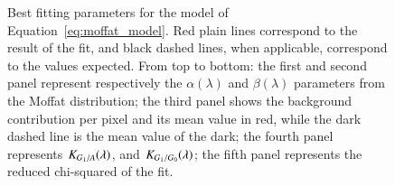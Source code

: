\begin{figure}[h]
     \centering
     \caption{Best fitting parameters for the model of Equation~\ref{eq:moffat_model}. Red plain lines correspond to the result of the fit, and black dashed lines, when applicable, correspond to the values expected. From top to bottom: the first and second panel represent respectively the $\alpha(\lambda)$ and $\beta(\lambda)$ parameters from the Moffat distribution; the third panel shows the background contribution per pixel and its mean value in red, while the dark dashed line is the mean value of the dark; the fourth panel represents $K_{G_1/A}(\lambda)$, and $K_{G_1/G_0}(\lambda)$; the fifth panel represents the reduced chi-squared of the fit.}
     \label{fig:result_params}
\end{figure}

%
%
%
%

